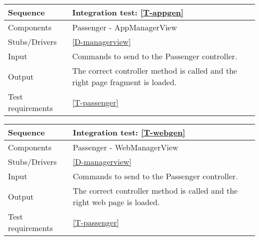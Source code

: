 \begin{table}[H]
    \begin{tabularx}{\textwidth}{l|X}
        \hline
        Sequence
        & 
        Integration test: \ref{T-appgen}
        \\ \hline
        Components 
        & 
        Passenger - AppManagerView
        \\ \hline
        Stubs/Drivers 
        & 
        \ref{D-managerview}
        \\ \hline
        Input 
        & 
        Commands to send to the Passenger controller.
        \\ \hline
        Output 
        & 
       The correct controller method is called and the right page fragment is loaded.
        \\ \hline
        Test requirements 
        & 
        \ref{T-passenger}
        \\ \hline
    \end{tabularx}
\end{table}

\begin{table}[H]
    \begin{tabularx}{\textwidth}{l|X}
        \hline
        Sequence
        & 
        Integration test: \ref{T-webgen}
        \\ \hline
        Components 
        & 
        Passenger - WebManagerView
        \\ \hline
        Stubs/Drivers 
        & 
        \ref{D-managerview}
        \\ \hline
        Input 
        & 
        Commands to send to the Passenger controller.
        \\ \hline
        Output 
        & 
        The correct controller method is called and the right web page is loaded.
        \\ \hline
        Test requirements 
        & 
        \ref{T-passenger}
        \\ \hline
    \end{tabularx}
\end{table}